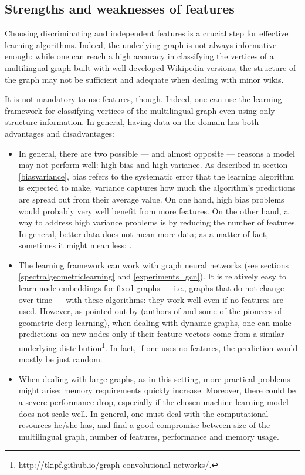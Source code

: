         \subsection{Strengths and weaknesses of features}
            Choosing discriminating and independent features is a crucial step for effective learning algorithms. Indeed, the underlying graph is not always informative enough: while one can reach a high accuracy in classifying the vertices of a multilingual graph built with well developed Wikipedia versions, the structure of the graph may not be sufficient and adequate when dealing with minor wikis.
        
            It is not mandatory to use features, though. Indeed, one can use the learning framework for classifying vertices of the multilingual graph even using only structure information. In general, having data on the domain has both advantages and disadvantages:
            \begin{itemize}
                \item In general, there are two possible --- and almost opposite --- reasons a model may not perform well: high bias and high variance. As described in section \ref{biasvariance}, bias refers to the systematic error that the learning algorithm is expected to make, variance captures how much the algorithm's predictions are spread out from their average value. On one hand, high bias problems would probably very well benefit from more features. On the other hand, a way to address high variance problems is by reducing the number of features. In general, better data does not mean more data; as a matter of fact, sometimes it might mean less:  \cite{Blum}.
                \item The learning framework can work with graph neural networks (see sections \ref{spectralgeometriclearning} and \ref{experiments_gcn}). It is relatively easy to learn node embeddings for fixed graphs --- i.e., graphs that do not change over time --- with these algorithms: they work well even if no features are used. However, as pointed out by \citeauthor{Kipf} (authors of \cite{Kipf} and some of the pioneers of geometric deep learning), when dealing with dynamic graphs, one can make predictions on new nodes only if their feature vectors come from a similar underlying distribution\footnote{\url{http://tkipf.github.io/graph-convolutional-networks/}.}. In fact, if one uses no features, the prediction would mostly be just random.
                \item When dealing with large graphs, as in this setting, more practical problems might arise: memory requirements quickly increase. Moreover, there could be a severe performance drop, especially if the chosen machine learning model does not scale well. In general, one must deal with the computational resources he/she has, and find a good compromise between size of the multilingual graph, number of features, performance and memory usage.
            \end{itemize}
